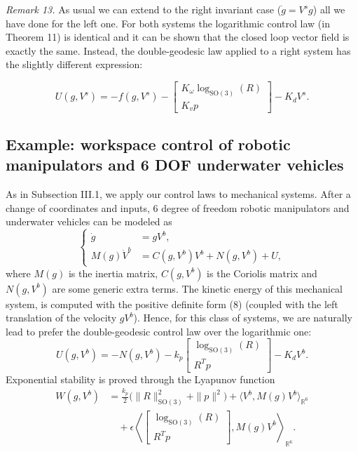 \documentclass[10pt,twocolumn]{article}
\newcommand{\SO}{\mathrm{SO}}
\newcommand{\R}{\mathbb R}
\newcommand{\paperhead}[2]{\par\medskip\noindent\textit{#1} #2\par}
\begin{document}
\paperhead{Remark 13.}{As usual we can extend to the right invariant case ($\dot g=V^s g$) all we have done for the left one. For both systems the logarithmic control law (in Theorem 11) is identical and it can be shown that the closed loop vector field is exactly the same. Instead, the double-geodesic law applied to a right system has the slightly different expression:}
\begin{equation*}
U(g,V^s)=-f(g,V^s)-
\begin{bmatrix}
K_\omega\log_{\SO(3)}(R)\\
K_vp
\end{bmatrix}-K_dV^s.
\end{equation*}

\subsection{Example: workspace control of robotic manipulators and 6 DOF underwater vehicles}
As in Subsection III.1, we apply our control laws to mechanical systems. After a change of coordinates and inputs, 6 degree of freedom robotic manipulators and underwater vehicles can be modeled as
\begin{equation*}
\left\{\begin{aligned}
\dot g&=gV^b,\\
M(g)\dot V^b&=C(g,V^b)V^b+N(g,V^b)+U,
\end{aligned}\right.
\end{equation*}
where $M(g)$ is the inertia matrix, $C(g,V^b)$ is the Coriolis matrix and $N(g,V^b)$ are some generic extra terms. The kinetic energy of this mechanical system, is computed with the positive definite form (8) (coupled with the left translation of the velocity $gV^b$). Hence, for this class of systems, we are naturally lead to prefer the double-geodesic control law over the logarithmic one:
\begin{equation*}
U(g,V^b)=-N(g,V^b)-k_p
\begin{bmatrix}
\log_{\SO(3)}(R)\\
R^Tp
\end{bmatrix}-K_dV^b.
\end{equation*}
Exponential stability is proved through the Lyapunov function
\begin{align*}
W(g,V^b)&=\frac{k_p}{2}\bigl(\|R\|_{\SO(3)}^2+\|p\|^2\bigr)
+\langle V^b,M(g)V^b\rangle_{\R^6}\\
&\quad+\epsilon\left\langle
\begin{bmatrix}\log_{\SO(3)}(R)\\R^Tp\end{bmatrix},
M(g)V^b
\right\rangle_{\R^6}.
\end{align*}
\end{document}

